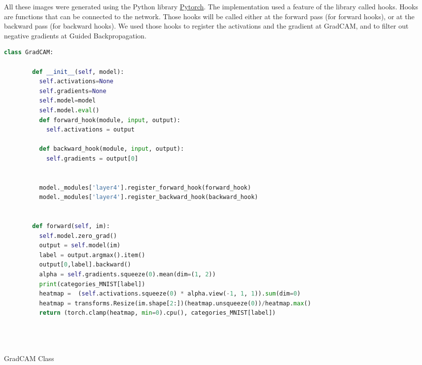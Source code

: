 All these images were generated using the Python library \href{https://pytorch.org/}{Pytorch}. The implementation used a feature of the library called hooks. Hooks are functions that can be connected to the network. Those hooks will be called either at the forward pass (for forward hooks), or at the backward pass (for backward hooks). We used those hooks to register the activations and the gradient at GradCAM, and to filter out negative gradients at Guided Backpropagation.
\begin{program} [H]
    \centering
    \label{code:gradcam_class}
    \begin{lstlisting}[language=Python, style=wider]
        class GradCAM:

        def __init__(self, model):
          self.activations=None
          self.gradients=None
          self.model=model
          self.model.eval()
          def forward_hook(module, input, output):
            self.activations = output
      
          def backward_hook(module, input, output):
            self.gradients = output[0]
      
      
          model._modules['layer4'].register_forward_hook(forward_hook)
          model._modules['layer4'].register_backward_hook(backward_hook)
      
      
        def forward(self, im):
          self.model.zero_grad()
          output = self.model(im)
          label = output.argmax().item()
          output[0,label].backward()
          alpha = self.gradients.squeeze(0).mean(dim=(1, 2))
          print(categories_MNIST[label])
          heatmap =  (self.activations.squeeze(0) * alpha.view(-1, 1, 1)).sum(dim=0)
          heatmap = transforms.Resize(im.shape[2:])(heatmap.unsqueeze(0))/heatmap.max()
          return (torch.clamp(heatmap, min=0).cpu(), categories_MNIST[label])
      
      
      
    \end{lstlisting}

    \caption{GradCAM Class}

    
\end{program}


